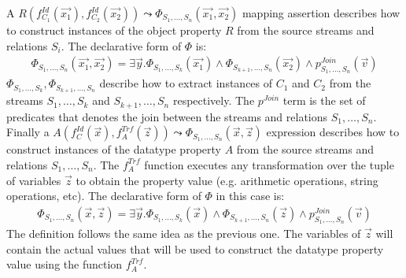 A $R(f_{C_1}^{Id}(\vec{x_1}),f_{C_2}^{Id}(\vec{x_2})) \leadsto \Phi_{S_1,\ldots,S_n}(\vec{x_1},\vec{x_2})$ mapping assertion describes how to construct instances of the object property $R$ from the source streams and relations $S_i$. The declarative form of $\Phi$ is:
\begin{align*}
\Phi_{S_1,\ldots,S_n}(\vec{x_1},\vec{x_2})= \exists\vec{y}.\Phi_{S_1,\ldots,S_k}(\vec{x_1}) \wedge \Phi_{S_{k+1},\ldots,S_n}(\vec{x_2}) \wedge p_{S_1,\ldots,S_n}^{Join}(\vec{v})
%
\end{align*}
$\Phi_{S_1,\ldots,S_k}, \Phi_{S_{k+1},\ldots,S_n}$ describe how to extract instances of $C_1$ and $C_2$ from the streams $S_1,\ldots,S_k$ and $S_{k+1},\ldots,S_n$ respectively. The $p^{Join}$ term is the set of predicates that denotes the join between the streams and relations $S_1,\ldots,S_n$.
\\

Finally a $A(f_C^{Id}(\vec{x}),f_A^{Trf}(\vec{z})) \leadsto \Phi_{S_1,\ldots,S_n}(\vec{x},\vec{z})$ expression describes how to construct instances of the datatype property $A$ from the source streams and relations $S_1,\ldots,S_n$. The $f_A^{Trf}$ function executes any transformation over the tuple of variables $\vec{z}$ to obtain the property value (e.g. arithmetic operations, string operations, etc). The declarative form of $\Phi$ in this case is:
\begin{align*}
\Phi_{S_1,\ldots,S_n}(\vec{x},\vec{z})= \exists\vec{y}.\Phi_{S_1,\ldots,S_k}(\vec{x})  \wedge \Phi_{S_{k+1},\ldots,S_n}(\vec{z}) \wedge p_{S_1,\ldots,S_n}^{Join}(\vec{v})
%
\end{align*}
The definition follows the same idea as the previous one. The variables of $\vec{z}$ will contain the actual values
that will be used to construct the datatype property value using the function $f_A^{Trf}$.
%

